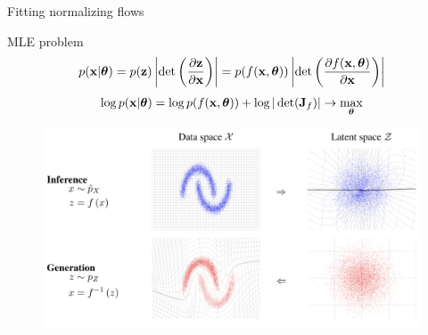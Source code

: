 \begin{frame}{Fitting normalizing flows}
	\begin{block}{MLE problem}
		\vspace{-0.3cm}
		\[
		p(\mathbf{x}|\boldsymbol{\theta}) = p(\mathbf{z}) \left|\det \left(  \frac{\partial \mathbf{z}}{\partial \mathbf{x}} \right) \right|  = p(f(\mathbf{x}, \boldsymbol{\theta})) \left|\det \left( \frac{\partial f(\mathbf{x}, \boldsymbol{\theta})}{\partial \mathbf{x}} \right) \right|
		\]
		\[
		\log p(\mathbf{x}|\boldsymbol{\theta}) = \log p(f(\mathbf{x}, \boldsymbol{\theta})) + \log  |\det (\mathbf{J}_f) | \rightarrow \max_{\boldsymbol{\theta}}
		\]
	\end{block}
	\vspace{-0.2cm}
	\begin{figure}
		\includegraphics[width=0.85\linewidth]{figs/flows_how2}
	\end{figure}
\end{frame}
